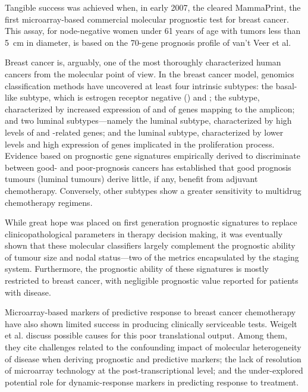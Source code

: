 Tangible success was achieved when, in early 2007, the  cleared
MammaPrint\textcopyright{}, the first microarray-based commercial molecular
prognostic test for breast cancer.\cite{fda_2007_2007} This assay, for
node-negative women under 61 years of age with tumors less than
\SIlist{5}{\centi\metre} in diameter, is based on the 70-gene prognosis profile
of van't Veer et al.\cite{vant_veer_gene_2002}

Breast cancer is, arguably, one of the most thoroughly characterized human
cancers from the molecular point of view.  In the breast cancer model, genomics
classification methods have uncovered at least four intrinsic subtypes: the
basal-like subtype, which is estrogen receptor negative
\mbox{()} and ; the  subtype,
characterized by increased expression of  and of genes mapping
to the  amplicon; and two luminal 
subtypes---namely the luminal  subtype, characterized by high
levels of  and -related genes; and the luminal
 subtype, characterized by lower  levels and high
expression of genes implicated in the proliferation
process.\cite{arpino_gene_2013} Evidence based on prognostic gene signatures
empirically derived to discriminate between good- and poor-prognosis cancers has
established that good prognosis  tumours (luminal 
tumours) derive little, if any, benefit from adjuvant chemotherapy.  Conversely,
other subtypes show a greater sensitivity to multidrug chemotherapy
regimens.\cite{weigelt_challenges_2012}

While great hope was placed on first generation prognostic signatures to replace
clinicopathological parameters in therapy decision making, it was eventually
shown that these molecular classifiers largely complement the prognostic ability
of tumour size and nodal status---two of the metrics encapsulated by the
 staging
system.\cite{sotiriou_gene-expression_2009,reis-filho_molecular_2010}
Furthermore, the prognostic ability of these signatures is mostly restricted to
 breast cancer, with negligible prognostic value reported for
patients with  disease.

Microarray-based markers of predictive response to breast cancer chemotherapy
have also shown limited success in producing clinically serviceable tests.
Weigelt et al.\cite{weigelt_challenges_2012} discuss possible causes for this
poor translational output.  Among them, they cite challenges related to the
confounding impact of molecular heterogeneity of disease when deriving
prognostic and predictive markers; the lack of resolution of microarray
technology at the post-transcriptional level; and the under-explored potential
role for dynamic-response markers in predicting response to treatment.

